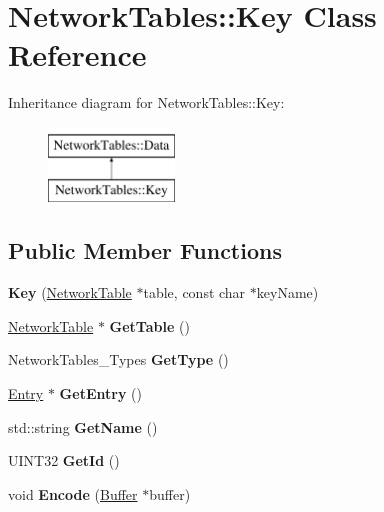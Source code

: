 \hypertarget{classNetworkTables_1_1Key}{
\section{NetworkTables::Key Class Reference}
\label{classNetworkTables_1_1Key}
}
Inheritance diagram for NetworkTables::Key:\begin{figure}[H]
\begin{center}
\leavevmode
\includegraphics[height=2.000000cm]{classNetworkTables_1_1Key}
\end{center}
\end{figure}
\subsection*{Public Member Functions}
\begin{DoxyCompactItemize}
\item 
\hypertarget{classNetworkTables_1_1Key_a55579beca80bee234c85bdfe9c8c3ef8}{
{\bfseries Key} (\hyperlink{classNetworkTable}{NetworkTable} $\ast$table, const char $\ast$keyName)}
\label{classNetworkTables_1_1Key_a55579beca80bee234c85bdfe9c8c3ef8}

\item 
\hypertarget{classNetworkTables_1_1Key_a6e09ce7aa28365ed60568e2a12b4ec51}{
\hyperlink{classNetworkTable}{NetworkTable} $\ast$ {\bfseries GetTable} ()}
\label{classNetworkTables_1_1Key_a6e09ce7aa28365ed60568e2a12b4ec51}

\item 
\hypertarget{classNetworkTables_1_1Key_a328d3876f5ae7074e00e3f814a816eaf}{
NetworkTables\_\-Types {\bfseries GetType} ()}
\label{classNetworkTables_1_1Key_a328d3876f5ae7074e00e3f814a816eaf}

\item 
\hypertarget{classNetworkTables_1_1Key_a2baed3ccddaa5fd29a2cbb9ab6d6b622}{
\hyperlink{classNetworkTables_1_1Entry}{Entry} $\ast$ {\bfseries GetEntry} ()}
\label{classNetworkTables_1_1Key_a2baed3ccddaa5fd29a2cbb9ab6d6b622}

\item 
\hypertarget{classNetworkTables_1_1Key_ae45e3a5616ac780d6966c8e80d0d5d05}{
std::string {\bfseries GetName} ()}
\label{classNetworkTables_1_1Key_ae45e3a5616ac780d6966c8e80d0d5d05}

\item 
\hypertarget{classNetworkTables_1_1Key_a9cc684b87b1936f8152bff1ebbe98ace}{
UINT32 {\bfseries GetId} ()}
\label{classNetworkTables_1_1Key_a9cc684b87b1936f8152bff1ebbe98ace}

\item 
\hypertarget{classNetworkTables_1_1Key_aa0b3ba3200e9ca54204c72b292329d33}{
void {\bfseries Encode} (\hyperlink{classNetworkTables_1_1Buffer}{Buffer} $\ast$buffer)}
\label{classNetworkTables_1_1Key_aa0b3ba3200e9ca54204c72b292329d33}

\end{DoxyCompactItemize}
